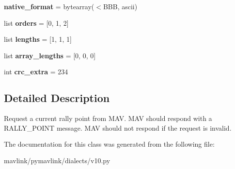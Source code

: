\begin{DoxyCompactItemize}
{\bfseries native\+\_\+format} = bytearray(\textquotesingle{}$<$B\+BB\textquotesingle{}, \textquotesingle{}ascii\textquotesingle{})
\item 
\mbox{\label{classpymavlink_1_1dialects_1_1v10_1_1MAVLink__rally__fetch__point__message_a2e3575b26e74f8feb6a6d05547033af4}} 
list {\bfseries orders} = \mbox{[}0, 1, 2\mbox{]}
\item 
\mbox{\label{classpymavlink_1_1dialects_1_1v10_1_1MAVLink__rally__fetch__point__message_aa82657a31a63fe01f8021ca102552ae0}} 
list {\bfseries lengths} = \mbox{[}1, 1, 1\mbox{]}
\item 
\mbox{\label{classpymavlink_1_1dialects_1_1v10_1_1MAVLink__rally__fetch__point__message_ae9fee1ddf9ff1ba6cd0a95e5c8664026}} 
list {\bfseries array\+\_\+lengths} = \mbox{[}0, 0, 0\mbox{]}
\item 
\mbox{\label{classpymavlink_1_1dialects_1_1v10_1_1MAVLink__rally__fetch__point__message_a22483fbf980743a2697220372323b8d9}} 
int {\bfseries crc\+\_\+extra} = 234
\end{DoxyCompactItemize}


\subsection{Detailed Description}
\begin{DoxyVerb}Request a current rally point from MAV. MAV should respond
with a RALLY_POINT message. MAV should not respond if the
request is invalid.
\end{DoxyVerb}
 

The documentation for this class was generated from the following file\+:\begin{DoxyCompactItemize}
\item 
mavlink/pymavlink/dialects/v10.\+py\end{DoxyCompactItemize}

